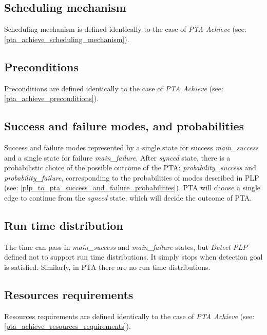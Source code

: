 \subsection{Scheduling mechanism}
Scheduling mechanism is defined identically to the case of \textit{PTA Achieve}  (see: \ref{pta_achieve_scheduling_mechanism}).\\
\subsection{Preconditions}
Preconditions are defined identically to the case of \textit{PTA Achieve} (see: \ref{pta_achieve_preconditions}).\\
\subsection{Success and failure modes, and probabilities}
Success and failure modes represented by a single state for success \textcolor{ColorUppaalState}{\textit{main_success}} and a single state for failure \textcolor{ColorUppaalState}{\textit{main_failure}}. After \textcolor{ColorUppaalState}{\textit{synced}} state, there is a probabilistic choice of the possible outcome of the PTA: \textcolor{ColorEdgeProbability}{\textit{probability_success}} and \textcolor{ColorEdgeProbability}{\textit{probability_failure}}, corresponding to the probabilities of modes described in PLP (see: \ref{plp_to_pta_success_and_failure_probabilities}). PTA will choose a single edge to continue from the \textcolor{ColorUppaalState}{\textit{synced}} state, which will decide the outcome of PTA.\\
\subsection{Run time distribution}
The time can pass in \textcolor{ColorUppaalState}{\textit{main_success}} and \textcolor{ColorUppaalState}{\textit{main_failure}} states, but \textit{Detect PLP} defined not to support run time distributions. It simply stops when detection goal is satisfied. Similarly, in PTA there are no run time distributions.\\
\subsection{Resources requirements}
Resources requirements are defined identically to the case of \textit{PTA Achieve} (see: \ref{pta_achieve_resources_requirements}).\\
